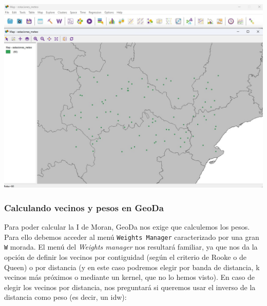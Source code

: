 \documentclass[
  letterpaper,
  DIV=11,
  numbers=noendperiod]{scrreprt}
\begin{document}
\includegraphics{images/geoda_aspecto.jpg}

\hypertarget{calculando-vecinos-y-pesos-en-geoda}{%
\subsubsection{Calculando vecinos y pesos en
GeoDa}\label{calculando-vecinos-y-pesos-en-geoda}}

Para poder calcular la I de Moran, GeoDa nos exige que calculemos los
pesos. Para ello debemos acceder al menú \texttt{Weights\ Manager}
caracterizado por una gran \texttt{W} morada. El menú del \emph{Weights
manager} nos resultará familiar, ya que nos da la opción de definir los
vecinos por contiguidad (según el criterio de Rooke o de Queen) o por
distancia (y en este caso podremos elegir por banda de distancia, k
vecinos más próximos o mediante un kernel, que no lo hemos visto). En
caso de elegir los vecinos por distancia, nos preguntará si queremos
usar el inverso de la distancia como peso (es decir, un idw):
\end{document}
